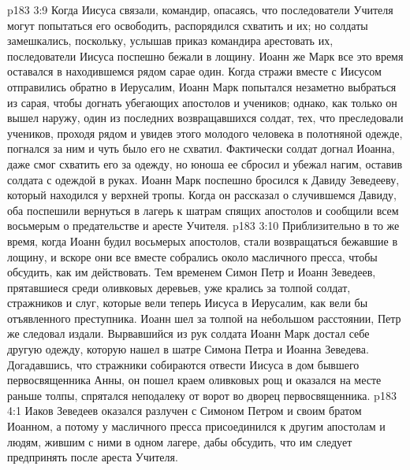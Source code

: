 \vs p183 3:9 Когда Иисуса связали, командир, опасаясь, что последователи Учителя могут попытаться его освободить, распорядился схватить и их; но солдаты замешкались, поскольку, услышав приказ командира арестовать их, последователи Иисуса поспешно бежали в лощину. Иоанн же Марк все это время оставался в находившемся рядом сарае один. Когда стражи вместе с Иисусом отправились обратно в Иерусалим, Иоанн Марк попытался незаметно выбраться из сарая, чтобы догнать убегающих апостолов и учеников; однако, как только он вышел наружу, один из последних возвращавшихся солдат, тех, что преследовали учеников, проходя рядом и увидев этого молодого человека в полотняной одежде, погнался за ним и чуть было его не схватил. Фактически солдат догнал Иоанна, даже смог схватить его за одежду, но юноша ее сбросил и убежал нагим, оставив солдата с одеждой в руках. Иоанн Марк поспешно бросился к Давиду Зеведееву, который находился у верхней тропы. Когда он рассказал о случившемся Давиду, оба поспешили вернуться в лагерь к шатрам спящих апостолов и сообщили всем восьмерым о предательстве и аресте Учителя.
\vs p183 3:10 Приблизительно в то же время, когда Иоанн будил восьмерых апостолов, стали возвращаться бежавшие в лощину, и вскоре они все вместе собрались около масличного пресса, чтобы обсудить, как им действовать. Тем временем Симон Петр и Иоанн Зеведеев, прятавшиеся среди оливковых деревьев, уже крались за толпой солдат, стражников и слуг, которые вели теперь Иисуса в Иерусалим, как вели бы отъявленного преступника. Иоанн шел за толпой на небольшом расстоянии, Петр же следовал издали. Вырвавшийся из рук солдата Иоанн Марк достал себе другую одежду, которую нашел в шатре Симона Петра и Иоанна Зеведева. Догадавшись, что стражники собираются отвести Иисуса в дом бывшего первосвященника Анны, он пошел краем оливковых рощ и оказался на месте раньше толпы, спрятался неподалеку от ворот во дворец первосвященника.
\vs p183 4:1 Иаков Зеведеев оказался разлучен с Симоном Петром и своим братом Иоанном, а потому у масличного пресса присоединился к другим апостолам и людям, жившим с ними в одном лагере, дабы обсудить, что им следует предпринять после ареста Учителя.
